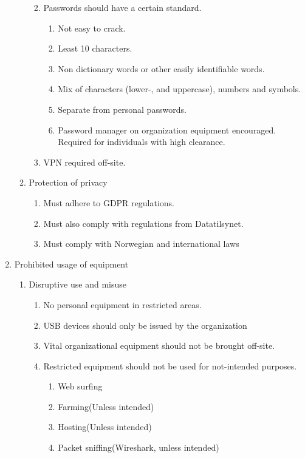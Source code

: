 \begin{enumerate}
\begin{enumerate}
\begin{enumerate}
\begin{enumerate}
      \end{enumerate}
      \item Passwords should have a certain standard.
      \begin{enumerate}
        \item Not easy to crack.
        \item Least 10 characters.
        \item Non dictionary words or other easily identifiable words.
        \item Mix of characters (lower-, and uppercase), numbers and symbols.
        \item Separate from personal passwords.
        \item Password manager on organization equipment encouraged. Required for individuals with high clearance.
      \end{enumerate}
      \item VPN required off-site.
    \end{enumerate}
    \item Protection of privacy
    \begin{enumerate}
      \item Must adhere to GDPR regulations.
      \item Must also comply with regulations from Datatilsynet.
      \item Must comply with Norwegian and international laws
    \end{enumerate}
  \end{enumerate}
  \item Prohibited usage of equipment
  \begin{enumerate}
    \item Disruptive use and misuse
    \begin{enumerate}
      \item No personal equipment in restricted areas.
      \item USB devices should only be issued by the organization
      \item Vital organizational equipment should not be brought off-site.
      \item Restricted equipment should not be used for not-intended purposes.
      \begin{enumerate}
        \item Web surfing
        \item Farming(Unless intended)
        \item Hosting(Unless intended)
        \item Packet sniffing(Wireshark, unless intended)

\end{enumerate}
\end{enumerate}
\end{enumerate}
\end{enumerate}
